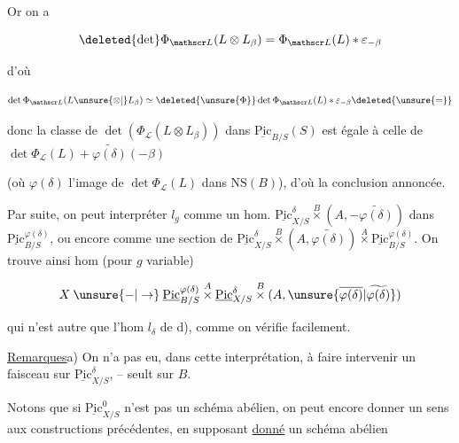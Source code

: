 
Or on a

\[
\deleted{\det}\Phi_{\mathscr L}(L\otimes L_\beta)=\Phi_{\mathscr L}(L)*\varepsilon_{-\beta}
\]

d'où

\[
\det\Phi_{\mathscr L}(L\unsure{\otimes|{}}L_\beta)\simeq\deleted{\unsure{\Phi}}\det\Phi_{\mathscr L}(L)*\varepsilon_{-\beta}\deleted{\unsure{=}}
\]

donc la classe de $\det(\Phi_{\mathscr L}(L\otimes L_\beta))$ dans $\underline{\mathrm{Pic}}_{B/S}(S)$ est égale à \deleted{$\det($} celle de $\det\Phi_{\mathscr L}(L)+\widetilde{\varphi(\delta)}(-\beta)$

(où $\varphi(\delta)$  l'image de $\det\Phi_{\mathscr L}(L)$ dans $\mathrm{NS}(B)$), d'où la conclusion annoncée.

Par suite, on peut interpréter $l_g$ comme un hom. $\underline{\mathrm{Pic}}^\delta_{X/S}\overset{B}{\times}(A,-\widetilde{\varphi(\delta)})$ dans $\underline{\mathrm{Pic}}^{\varphi(\delta)}_{B/S}$, ou encore comme une  section de $\underline{\mathrm{Pic}}^\delta_{X/S}\overset{B}{\times}(A,\widetilde{\varphi(\delta)})\overset{A}{\times}\underline{\mathrm{Pic}}^{\varphi(\delta)}_{B/S}$. On trouve ainsi  hom (pour $g$ variable)

\[
X\mathbin{\unsure{-|\to}}\underline{\mathrm{Pic}}^{\varphi(\delta)}_{B/S}\overset{A}{\times}\underline{\mathrm{Pic}}^\delta_{X/S}\overset{B}{\times}(A,\unsure{\overline{\varphi(\delta)}|\widetilde{\varphi(\delta)}})
\]

qui n'est autre que  l'hom $l_\delta$ de d), comme on vérifie facilement.

\uline{Remarques}\qquad a) On n'a pas eu, dans cette interprétation, à faire intervenir un faisceau sur $\underline{\mathrm{Pic}}^\delta_{X/S}$, -- seult sur $B$.

Notons que si $\underline{\mathrm{Pic}}^0_{X/S}$ n'est pas un schéma abélien, on peut encore donner un sens aux constructions précédentes, en supposant \uline{donné} un schéma abélien
